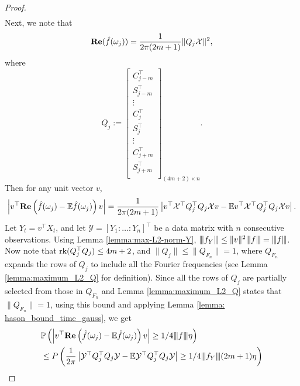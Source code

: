 \begin{proof}
\begin{equation}
\begin{aligned}
\end{aligned}
\end{equation}
Next, we note that 
\begin{equation}
\label{eq:qudratic representation}
\mathbf{\bf{Re}}(\hat{f}(\omega_j)) = \frac{1}{2\pi(2m+1)} \|Q_j\mathcal{X}\|^2,\nonumber
\end{equation}
where 
\begin{equation}
Q_j := \left[ 
\begin{array}{llll}
C_{j-m}^\top\\
S_{j-m}^\top \\
\vdots\\
C_j^\top\\
S_j^\top\\
\vdots\\
C_{j+m}^\top\\
S_{j+m}^\top\\ 
\end{array}
\right]_{(4m+2)\times n}.\nonumber
\end{equation}
Then for any unit vector $v$, 
\begin{equation}
\left|v^\top \mathrm{\bf{Re}}\left(\hat{f}(\omega_j) - \mathbb{E}\hat{f}(\omega_j)\right)v \right| = \frac{1}{2\pi(2m+1)}\left|v^\top \mathcal{X}^\top Q_j^\top Q_j \mathcal{X}v - \mathbb{E} v^\top \mathcal{X}^\top Q_j^\top Q_j \mathcal{X}v\right|.\nonumber
\end{equation}
Let $Y_t = v^\top X_t$, and let $\mathcal{Y} = [Y_1: \ldots: Y_n]^\top$ be a data matrix with $n$ consecutive observations.  Using Lemma  \ref{lemma:max-L2-norm-Y}, ${\left\vert\kern-0.25ex\left\vert\kern-0.25ex\left\vert f_Y \right\vert\kern-0.25ex\right\vert\kern-0.25ex\right\vert} \le \|v\|^2 {\left\vert\kern-0.25ex\left\vert\kern-0.25ex\left\vert f \right\vert\kern-0.25ex\right\vert\kern-0.25ex\right\vert} = {\left\vert\kern-0.25ex\left\vert\kern-0.25ex\left\vert f \right\vert\kern-0.25ex\right\vert\kern-0.25ex\right\vert}$. Now note that  $\mbox{rk}(Q^{\top}_jQ_j) \le 4m+2$, and $\|Q_j\|\le \|Q_{F_n}\|=1$, where $Q_{F_n}$ expands the rows of $Q_j$ to include all the Fourier frequencies (see Lemma \ref{lemma:maximum_L2_Q} for definition). Since all the rows of $Q_j$ are partially selected from those in $Q_{F_n}$ and Lemma \ref{lemma:maximum_L2_Q} states that $\|Q_{F_n}\|=1$, using this bound and applying Lemma \ref{lemma: hason_bound_time_gauss}, we get 
\begin{equation}
\label{eq:mul_real_vv}
\begin{aligned}
&\mathbb{P}\left(\left|v^\top \mathrm{\bf{Re}}\left(\hat{f}(\omega_j) - \mathbb{E}\hat{f}(\omega_j)\right)v\right| \ge 1/4\vertiii{f}\eta\right) \\
&\le P\left(\frac{1}{2\pi}\left|\mathcal{Y}^\top Q^{\top}_jQ_j\mathcal{Y} - \mathbb{E}\mathcal{Y}^\top Q^{\top}_jQ_j\mathcal{Y}\right|\ge 1/4  \vertiii{f_Y}(2m+1)\eta\right)\\

\end{aligned}
\end{equation}
\end{proof}
